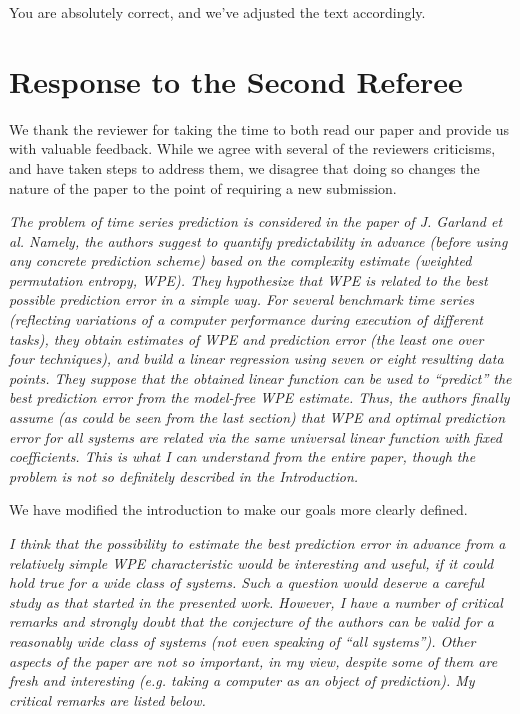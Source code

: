 \documentclass[12pt]{article}
\newcommand{\alert}[1]{{\color{red}#1}}
\begin{document}
You are absolutely correct, and we've adjusted the text accordingly.

\section*{Response to the Second Referee}

We thank the reviewer for taking the time to both read our paper and provide us
with valuable feedback. While we agree with several of the reviewers criticisms,
and have taken steps to address them, we disagree that doing so changes the
nature of the paper to the point of requiring a new submission.

\emph{The problem of time series prediction is considered in the paper of J.
Garland et al. Namely, the authors suggest to quantify predictability in advance
(before using any concrete prediction scheme) based on the complexity estimate
(weighted permutation entropy, WPE). They hypothesize that WPE is related to the
best possible prediction error in a simple way. For several benchmark time
series (reflecting variations of a computer performance during execution of
different tasks), they obtain estimates of WPE and prediction error (the least
one over four techniques), and build a linear regression using seven or eight
resulting data points. They suppose that the obtained linear function can be
used to ``predict'' the best prediction error from the model-free WPE estimate.
Thus, the authors finally assume (as could be seen from the last section) that
WPE and optimal prediction error for all systems are related via the same
universal linear function with fixed coefficients. This is what I can understand
from the entire paper, though the problem is not so definitely described in the
Introduction.}

\alert{We have modified the introduction to make our goals more clearly
defined.}

\emph{I think that the possibility to estimate the best prediction error in
advance from a relatively simple WPE characteristic would be interesting and
useful, if it could hold true for a wide class of systems. Such a question would
deserve a careful study as that started in the presented work. However, I have a
number of critical remarks and strongly doubt that the conjecture of the authors
can be valid for a reasonably wide class of systems (not even speaking of ``all
systems''). Other aspects of the paper are not so important, in my view, despite
some of them are fresh and interesting (e.g. taking a computer as an object of
prediction). My critical remarks are listed below.}
\end{document}
